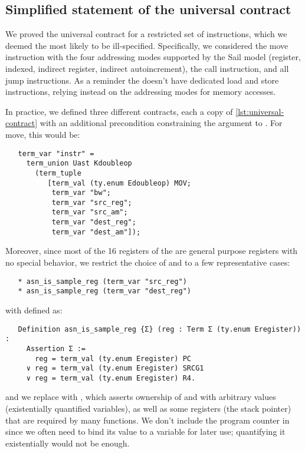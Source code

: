 \subsection{Simplified statement of the universal contract}
\label{sec:uc-simple}

We proved the universal contract for a restricted set of instructions, which we deemed the most likely to be ill-specified. Specifically, we considered the move instruction with the four addressing modes supported by the Sail model (register, indexed, indirect register, indirect autoincrement), the call instruction, and all jump instructions. As a reminder the \msp doesn't have dedicated load and store instructions, relying instead on the addressing modes for memory accesses.

In practice, we defined three different contracts, each a copy of \cref{lst:universal-contract} with an additional precondition constraining the  argument to . For move, this would be:
\begin{verbatim}
   term_var "instr" =
     term_union Uast Kdoubleop
       (term_tuple
          [term_val (ty.enum Edoubleop) MOV;
           term_var "bw";
           term_var "src_reg";
           term_var "src_am";
           term_var "dest_reg";
           term_var "dest_am"]);
\end{verbatim}
Moreover, since most of the 16 registers of the \msp are general purpose registers with no special behavior, we restrict the choice of  and  to a few representative cases:
\begin{verbatim}
   * asn_is_sample_reg (term_var "src_reg")
   * asn_is_sample_reg (term_var "dest_reg")
\end{verbatim}
with  defined as:
\begin{verbatim}
   Definition asn_is_sample_reg {Σ} (reg : Term Σ (ty.enum Eregister)) :
     Assertion Σ :=
       reg = term_val (ty.enum Eregister) PC
     ∨ reg = term_val (ty.enum Eregister) SRCG1
     ∨ reg = term_val (ty.enum Eregister) R4.
\end{verbatim}
and we replace  with , which asserts ownership of  and  with arbitrary values (existentially quantified variables), as well as some registers (\eg the stack pointer) that are required by many functions. We don't include the program counter in  since we often need to bind its value to a variable for later use; quantifying it existentially would not be enough.

